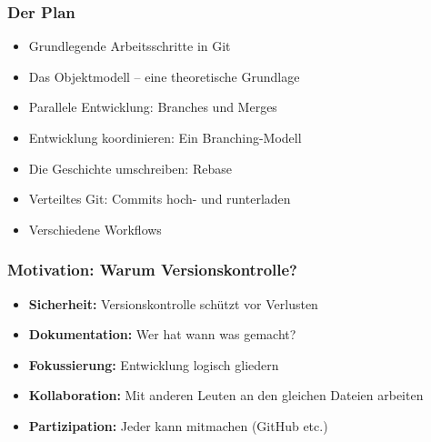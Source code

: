 \documentclass{beamer}
\begin{document}
\begin{frame}
 \frametitle{Der Plan}

 \begin{itemize}
	\item Grundlegende Arbeitsschritte in Git
	\item Das Objektmodell -- eine theoretische Grundlage
	\item Parallele Entwicklung: Branches und Merges
	\item Entwicklung koordinieren: Ein Branching-Modell
	\item Die Geschichte umschreiben: Rebase
	\item Verteiltes Git: Commits hoch- und runterladen
	\item Verschiedene Workflows
\end{itemize}

 \end{frame}
\begin{frame}
 \frametitle{Motivation: Warum Versionskontrolle?}

 \begin{itemize}
	\item \textbf{Sicherheit:} Versionskontrolle schützt vor Verlusten
	\item \textbf{Dokumentation:} Wer hat wann was gemacht?
	\item \textbf{Fokussierung:} Entwicklung logisch gliedern
	\item \textbf{Kollaboration:} Mit anderen Leuten an den gleichen Dateien arbeiten
	\item \textbf{Partizipation:} Jeder kann mitmachen (GitHub etc.)
\end{itemize}

 \end{frame}
\end{document}
